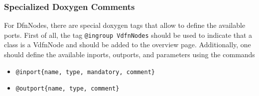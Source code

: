 \subsubsection{Specialized Doxygen Comments}
For DfnNodes, there are special doxygen tags that allow to define the available ports.
First of all, the tag \texttt{@ingroup VdfnNodes} should be used to indicate that a class is a VdfnNode and should be added to the overview page.
Additionally, one should define the available inports, outports, and parameters using the commands
\begin{itemize}
\item \texttt{@inport\{name, type, mandatory, comment\}}
\item \texttt{@outport\{name, type, comment\}}
\end{itemize}
